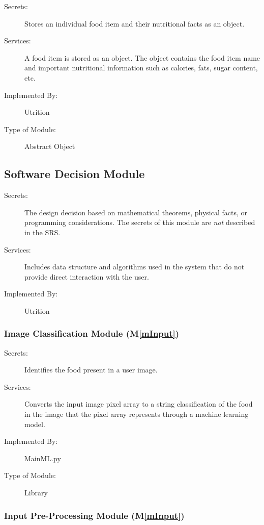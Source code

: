 \documentclass[12pt, titlepage]{article}
\newcommand{\mref}[1]{M\ref{#1}}
\begin{document}
\begin{description}
	\item[Secrets:]Stores an individual food item and their nutritional facts as an object.
	\item[Services:]A food item is stored as an object. The object contains the food item name and important nutritional information such as calories, fats, sugar content, etc.
	\item[Implemented By:] Utrition
	\item[Type of Module:] Abstract Object
\end{description}

\subsection{Software Decision Module}

\begin{description}
\item[Secrets:] The design decision based on mathematical theorems, physical
  facts, or programming considerations. The secrets of this module are
  \emph{not} described in the SRS.
\item[Services:] Includes data structure and algorithms used in the system that
  do not provide direct interaction with the user. 
\item[Implemented By:] Utrition
\end{description}

\subsubsection{Image Classification Module (\mref{mInput})}

\begin{description}
\item[Secrets:] Identifies the food present in a user image.
\item[Services:]Converts the input image pixel array to a string classification 
of the food in the image that the pixel array represents through a machine 
learning model.
\item[Implemented By:] MainML.py
\item[Type of Module:] Library
\end{description}

\subsubsection{Input Pre-Processing Module (\mref{mInput})}
\end{document}

